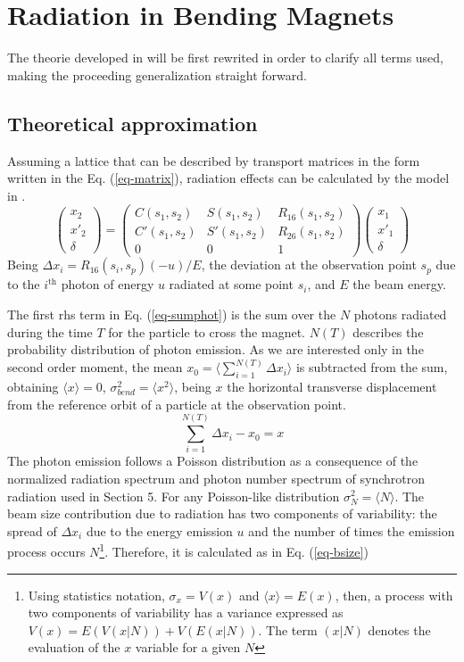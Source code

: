 \chapter{Radiation in Bending Magnets}\label{bendrad}
The theorie developed in \cite{Sands} will be first rewrited in order to clarify all terms used, making the proceeding generalization straight forward.
\section{Theoretical approximation}\label{radtheo}
Assuming a lattice that can be described by transport matrices in the form written in the Eq. (\ref{eq-matrix}), radiation effects can be calculated by the model in  \cite{Sands}.
\begin{equation}
\begin{pmatrix}
x_2\\
x'_2\\
\delta
\end{pmatrix}
=
\begin{pmatrix}
 C(s_1,s_2) & S(s_1,s_2)& R_{16}(s_1,s_2)\\
 C'(s_1,s_2) & S'(s_1,s_2) & R_{26}(s_1,s_2)\\
 0 & 0 &1
\end{pmatrix}
\begin{pmatrix}
x_1\\
x'_1\\
\delta
\end{pmatrix}
\label{eq-matrix}
\end{equation}
Being $\Delta x_i = R_{16}(s_i,s_p) (-u)/E$, the deviation at the observation point $s_p$ due to the $i^{\text{th}}$ photon of energy $u$ radiated at some point $s_i$, and $E$ the beam energy.\par The first rhs term in Eq. (\ref{eq-sumphot}) is the sum over the $N$ photons radiated during the time $T$ for the particle to cross the magnet. $N(T)$ describes the probability distribution of photon emission. As we are interested only in the second order moment, the mean  $x_0=\langle\sum_{i=1}^{N(T)}\Delta x_i\rangle$ is subtracted from the sum, obtaining $\langle x\rangle=0$, $ \sigma_{bend}^2=\langle x^2\rangle$, being $x$ the horizontal transverse displacement from the reference orbit of a particle at the observation point.
\begin{equation}
\sum_{i=1}^{N(T)}\Delta x_i - x_0 = x\label{eq-sumphot}
\end{equation}
The photon emission follows a Poisson distribution as a consequence of the normalized radiation spectrum and photon number spectrum of synchrotron radiation used in \cite{Sands2} Section 5. For any Poisson-like distribution $\sigma_N^2 = \langle N\rangle$. The beam size contribution due to radiation has two components of variability: the spread of $\Delta x_i$ due to the energy emission $u$ and the number of times the emission process occurs $N$\footnote{Using statistics notation, $\sigma_x=V(x)$ and $\langle x\rangle=E(x)$, then, a process with two components of variability has a variance expressed as $V(x)=E(V(x|N))+V(E(x|N))$. The term $(x|N)$ denotes the evaluation of the $x$ variable for a given $N$}. Therefore, it is calculated as in Eq. (\ref{eq-bsize})
